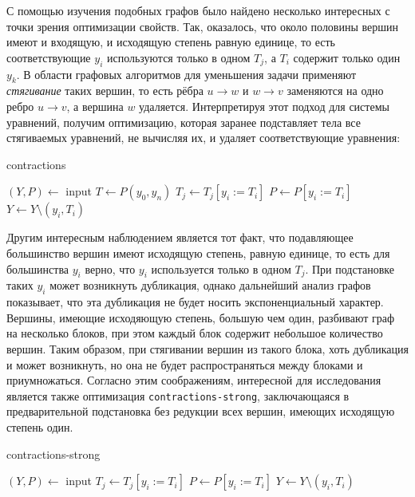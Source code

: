 \documentclass[../diploma.tex]{subfiles}
\begin{document}
С помощью изучения подобных графов было найдено несколько интересных с точки зрения оптимизации свойств. Так, оказалось, что около половины вершин имеют и входящую, и исходящую степень равную единице, то есть соответствующие $y_i$ используются только в одном $T_j$, а $T_i$ содержит только один $y_k$. В области графовых алгоритмов для уменьшения задачи применяют \textit{стягивание} таких вершин, то есть рёбра $u\rightarrow w$ и $w\rightarrow v$ заменяются на одно ребро $u\rightarrow v$, а вершина $w$ удаляется. Интерпретируя этот подход для системы уравнений, получим оптимизацию, которая заранее подставляет тела все стягиваемых уравнений, не вычисляя их, и удаляет соответствующие уравнения:

\begin{megaalgorithm}
    \caption{contractions}
  \begin{algorithmic}
    \State $(Y, P)\gets$ input
    \State $T \gets P(y_0, y_n)$
                \State $T_j \gets T_j [y_i := T_i]$
            \EndFor
            \State $P \gets P [y_i := T_i]$
            \State $Y \gets Y \setminus (y_i, T_i)$
        \EndIf
    \EndFor
    \State {}
  \end{algorithmic}
\end{megaalgorithm}

Другим интересным наблюдением является тот факт, что подавляющее большинство вершин имеют исходящую степень, равную единице, то есть для большинства $y_i$ верно, что $y_i$ используется только в одном $T_j$. При подстановке таких $y_i$ может возникнуть дубликация, однако дальнейший анализ графов показывает, что эта дубликация не будет носить экспоненциальный характер. Вершины, имеющие исходяющую степень, большую чем один, разбивают граф на несколько блоков, при этом каждый блок содержит небольшое количество вершин. Таким образом, при стягивании вершин из такого блока, хоть дубликация и может возникнуть, но она не будет распространяться между блоками и приумножаться. Согласно этим соображениям, интересной для исследования является также оптимизация \texttt{contractions-strong}, заключающаяся в предварительной подстановка без редукции всех вершин, имеющих исходящую степень один.

\begin{megaalgorithm}
    \caption{contractions-strong}
  \begin{algorithmic}
    \State $(Y, P)\gets$ input
        \If{\textcolor{red}{$outdeg(y_i) = 1$}}
                \State $T_j \gets T_j [y_i := T_i]$
            \EndFor
            \State $P \gets P [y_i := T_i]$
            \State $Y\gets Y \setminus (y_i, T_i)$
        \EndIf
    \EndFor
    \State {}
  \end{algorithmic}
\end{megaalgorithm}
\end{document}
